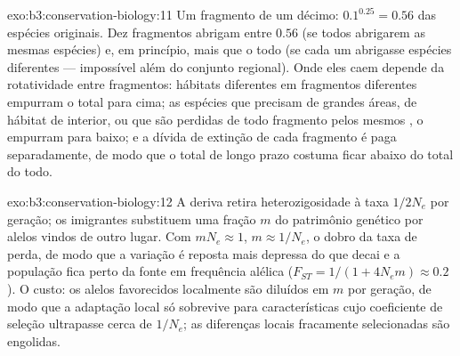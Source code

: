 \begin{solution}{exo:b3:conservation-biology:11}
Um fragmento de um décimo: $0.1^{0.25} = 0.56$ das espécies originais.
Dez fragmentos abrigam entre $0.56$ (se todos abrigarem as mesmas
espécies) e, em princípio, mais que o todo (se cada um abrigasse espécies
diferentes --- impossível além do conjunto regional). Onde eles caem
depende da rotatividade entre fragmentos: hábitats diferentes em
fragmentos diferentes empurram o total para cima; as espécies que
precisam de grandes áreas, de hábitat de interior, ou que são perdidas de
todo fragmento pelos mesmos , o empurram para baixo; e a
dívida de extinção de cada fragmento é paga separadamente, de modo que o
total de longo prazo costuma ficar abaixo do total do todo.
\end{solution}

\begin{solution}{exo:b3:conservation-biology:12}
A deriva retira heterozigosidade à taxa $1/2N_{e}$ por geração; os
imigrantes substituem uma fração $m$ do patrimônio genético por alelos
vindos de outro lugar. Com $mN_{e} \approx 1$, $m \approx 1/N_{e}$, o
dobro da taxa de perda, de modo que a variação é reposta mais depressa do
que decai e a população fica perto da fonte em frequência alélica
($F_{ST} = 1/(1
+ 4N_{e}m) \approx 0.2$). O custo: os alelos favorecidos
localmente são diluídos em $m$ por geração, de modo que a adaptação local
só sobrevive para características cujo coeficiente de seleção ultrapasse
cerca de $1/N_{e}$; as diferenças locais fracamente selecionadas são
engolidas.
\end{solution}

